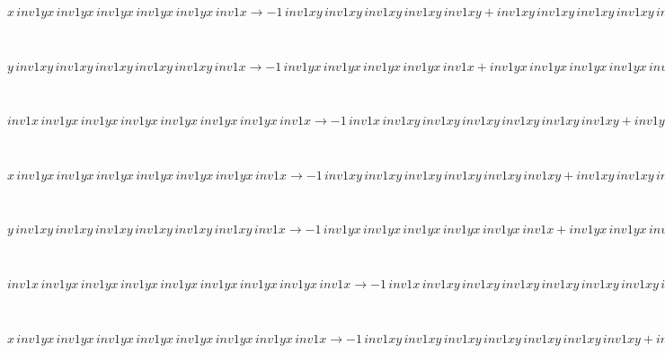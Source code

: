 \begin{minipage}{6in}
$
x\,
 inv1yx\,
 inv1yx\,
 inv1yx\,
 inv1yx\,
 inv1yx\,
 inv1x\rightarrow -1\,
 inv1xy\,
 inv1xy\,
 inv1xy\,
 inv1xy\,
 inv1xy + inv1xy\,
 inv1xy\,
 inv1xy\,
 inv1xy\,
 inv1xy\,
 inv1x
$
\end{minipage}\medskip \\
\begin{minipage}{6in}
$
y\,
 inv1xy\,
 inv1xy\,
 inv1xy\,
 inv1xy\,
 inv1xy\,
 inv1x\rightarrow -1\,
 inv1yx\,
 inv1yx\,
 inv1yx\,
 inv1yx\,
 inv1x + inv1yx\,
 inv1yx\,
 inv1yx\,
 inv1yx\,
 inv1yx\,
 inv1x + y\,
 inv1xy\,
 inv1xy\,
 inv1xy\,
 inv1xy\,
 inv1xy
$
\end{minipage}\medskip \\
\begin{minipage}{6in}
$
inv1x\,
 inv1yx\,
 inv1yx\,
 inv1yx\,
 inv1yx\,
 inv1yx\,
 inv1yx\,
 inv1x\rightarrow -1\,
 inv1x\,
 inv1xy\,
 inv1xy\,
 inv1xy\,
 inv1xy\,
 inv1xy\,
 inv1xy + inv1yx\,
 inv1yx\,
 inv1yx\,
 inv1yx\,
 inv1yx\,
 inv1yx\,
 inv1x + inv1x\,
 inv1xy\,
 inv1xy\,
 inv1xy\,
 inv1xy\,
 inv1xy\,
 inv1xy\,
 inv1x
$
\end{minipage}\medskip \\
\begin{minipage}{6in}
$
x\,
 inv1yx\,
 inv1yx\,
 inv1yx\,
 inv1yx\,
 inv1yx\,
 inv1yx\,
 inv1x\rightarrow -1\,
 inv1xy\,
 inv1xy\,
 inv1xy\,
 inv1xy\,
 inv1xy\,
 inv1xy + inv1xy\,
 inv1xy\,
 inv1xy\,
 inv1xy\,
 inv1xy\,
 inv1xy\,
 inv1x
$
\end{minipage}\medskip \\
\begin{minipage}{6in}
$
y\,
 inv1xy\,
 inv1xy\,
 inv1xy\,
 inv1xy\,
 inv1xy\,
 inv1xy\,
 inv1x\rightarrow -1\,
 inv1yx\,
 inv1yx\,
 inv1yx\,
 inv1yx\,
 inv1yx\,
 inv1x + inv1yx\,
 inv1yx\,
 inv1yx\,
 inv1yx\,
 inv1yx\,
 inv1yx\,
 inv1x + y\,
 inv1xy\,
 inv1xy\,
 inv1xy\,
 inv1xy\,
 inv1xy\,
 inv1xy
$
\end{minipage}\medskip \\
\begin{minipage}{6in}
$
inv1x\,
 inv1yx\,
 inv1yx\,
 inv1yx\,
 inv1yx\,
 inv1yx\,
 inv1yx\,
 inv1yx\,
 inv1x\rightarrow -1\,
 inv1x\,
 inv1xy\,
 inv1xy\,
 inv1xy\,
 inv1xy\,
 inv1xy\,
 inv1xy\,
 inv1xy + inv1yx\,
 inv1yx\,
 inv1yx\,
 inv1yx\,
 inv1yx\,
 inv1yx\,
 inv1yx\,
 inv1x + inv1x\,
 inv1xy\,
 inv1xy\,
 inv1xy\,
 inv1xy\,
 inv1xy\,
 inv1xy\,
 inv1xy\,
 inv1x
$
\end{minipage}\medskip \\
\begin{minipage}{6in}
$
x\,
 inv1yx\,
 inv1yx\,
 inv1yx\,
 inv1yx\,
 inv1yx\,
 inv1yx\,
 inv1yx\,
 inv1x\rightarrow -1\,
 inv1xy\,
 inv1xy\,
 inv1xy\,
 inv1xy\,
 inv1xy\,
 inv1xy\,
 inv1xy + inv1xy\,
 inv1xy\,
 inv1xy\,
 inv1xy\,
 inv1xy\,
 inv1xy\,
 inv1xy\,
 inv1x
$
\end{minipage}\medskip \\

